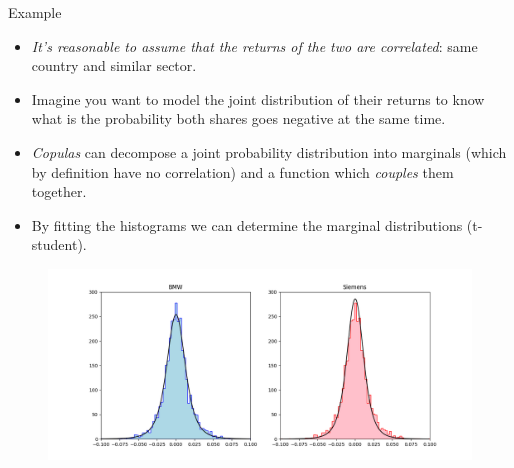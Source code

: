 \documentclass{beamer}
\begin{document}
\begin{frame}{Example}
  \begin{itemize}
    \item \emph{It's reasonable to assume that the returns of the two are correlated}: same country and similar sector.
    \item Imagine you want to model the joint distribution of their returns to know what is the probability both shares goes negative at the same time.
    \item \emph{Copulas} can decompose a joint probability distribution into marginals (which by definition have no correlation) and a function which \emph{couples} them together.
    \item By fitting the histograms we can determine the marginal distributions (t-student).
  \end{itemize}
 \begin{figure}[h]
   \begin{center}
     \includegraphics[width=0.65\linewidth]{bmw_siemens_dist}
   \end{center}
 \end{figure}
\end{frame}
\end{document}
